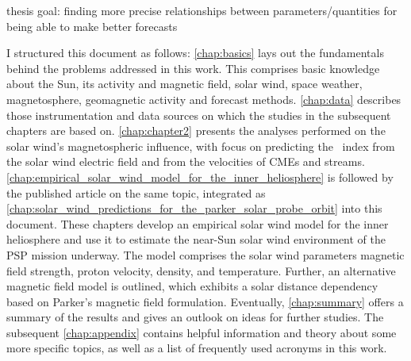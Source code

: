 thesis goal: finding more precise relationships between parameters/quantities for being able to make better forecasts\\


\bigskip

I structured this document as follows: \autoref{chap:basics} lays out the fundamentals behind the problems addressed in this work. This comprises basic knowledge about the Sun, its activity and magnetic field, solar wind, space weather, magnetosphere, geomagnetic activity and forecast methods. \autoref{chap:data} describes those instrumentation and data sources on which the studies in the subsequent chapters are based on. \autoref{chap:chapter2} presents the analyses performed on the solar wind's magnetospheric influence, with focus on predicting the \Kp~index from the solar wind electric field and from the velocities of CMEs and streams. \autoref{chap:empirical_solar_wind_model_for_the_inner_heliosphere} is followed by the published article on the same topic, integrated as \autoref{chap:solar_wind_predictions_for_the_parker_solar_probe_orbit} into this document. These chapters develop an empirical solar wind model for the inner heliosphere and use it to estimate the near-Sun solar wind environment of the PSP mission underway. The model comprises the solar wind parameters magnetic field strength, proton velocity, density, and temperature. Further, an alternative magnetic field model is outlined, which exhibits a solar distance dependency based on Parker's magnetic field formulation. Eventually, \autoref{chap:summary} offers a summary of the results and gives an outlook on ideas for further studies. The subsequent \autoref{chap:appendix} contains helpful information and theory about some more specific topics, as well as a list of frequently used acronyms in this work.


